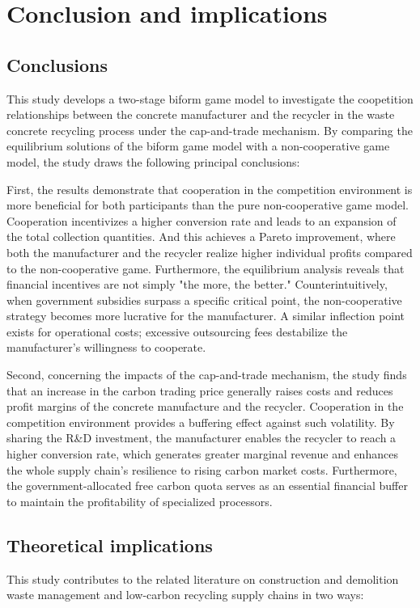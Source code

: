 \documentclass[authoryear,preprint,review,times,10pt]{elsarticle}
\begin{document}
\section{Conclusion and implications}
\subsection{Conclusions}

This study develops a two-stage biform game model to investigate the coopetition relationships between the concrete manufacturer and the recycler in the waste concrete recycling process under the cap-and-trade mechanism. By comparing the equilibrium solutions of the biform game model with a non-cooperative game model, the study draws the following principal conclusions:

First, the results demonstrate that cooperation in the competition environment is more beneficial for both participants than the pure non-cooperative game model. Cooperation incentivizes a higher conversion rate and leads to an expansion of the total collection quantities. And this achieves a Pareto improvement, where both the manufacturer and the recycler realize higher individual profits compared to the non-cooperative game. Furthermore, the equilibrium analysis reveals that financial incentives are not simply "the more, the better." Counterintuitively, when government subsidies surpass a specific critical point, the non-cooperative strategy becomes more lucrative for the manufacturer. A similar inflection point exists for operational costs; excessive outsourcing fees destabilize the manufacturer's willingness to cooperate.

Second, concerning the impacts of the cap-and-trade mechanism, the study finds that an increase in the carbon trading price generally raises costs and reduces profit margins of the concrete manufacture and the recycler. Cooperation in the competition environment provides a buffering effect against such volatility. By sharing the R\&D investment, the manufacturer enables the recycler to reach a higher conversion rate, which generates greater marginal revenue and enhances the whole supply chain's resilience to rising carbon market costs. Furthermore, the government-allocated free carbon quota serves as an essential financial buffer to maintain the profitability of specialized processors. 

\subsection{Theoretical implications}
This study contributes to the related literature on construction and demolition waste management and low-carbon recycling supply chains in two ways:
\end{document}
